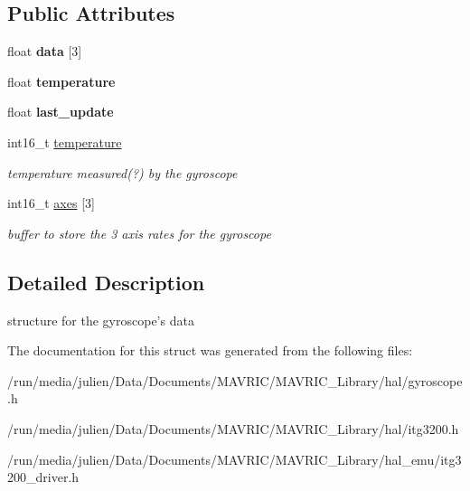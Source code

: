 \subsection*{Public Attributes}
\begin{DoxyCompactItemize}
\item 
\hypertarget{structgyroscope__t_a3ba0fce8e6f280ed2cded2ec97c567e9}{float {\bfseries data} \mbox{[}3\mbox{]}}\label{structgyroscope__t_a3ba0fce8e6f280ed2cded2ec97c567e9}

\item 
\hypertarget{structgyroscope__t_aba7959ef2e0ad2983dc80be17a2e9ab1}{float {\bfseries temperature}}\label{structgyroscope__t_aba7959ef2e0ad2983dc80be17a2e9ab1}

\item 
\hypertarget{structgyroscope__t_a8f8871fc763e415bc9837b1f4c4db964}{float {\bfseries last\+\_\+update}}\label{structgyroscope__t_a8f8871fc763e415bc9837b1f4c4db964}

\item 
\hypertarget{structgyroscope__t_aba7959ef2e0ad2983dc80be17a2e9ab1}{int16\+\_\+t \hyperlink{structgyroscope__t_aba7959ef2e0ad2983dc80be17a2e9ab1}{temperature}}\label{structgyroscope__t_aba7959ef2e0ad2983dc80be17a2e9ab1}

\begin{DoxyCompactList}\small\item\em temperature measured(?) by the gyroscope \end{DoxyCompactList}\item 
\hypertarget{structgyroscope__t_a2657eb86feb4ba0ac21e09d19307208b}{int16\+\_\+t \hyperlink{structgyroscope__t_a2657eb86feb4ba0ac21e09d19307208b}{axes} \mbox{[}3\mbox{]}}\label{structgyroscope__t_a2657eb86feb4ba0ac21e09d19307208b}

\begin{DoxyCompactList}\small\item\em buffer to store the 3 axis rates for the gyroscope \end{DoxyCompactList}\end{DoxyCompactItemize}


\subsection{Detailed Description}
structure for the gyroscope's data 

The documentation for this struct was generated from the following files\+:\begin{DoxyCompactItemize}
\item 
/run/media/julien/\+Data/\+Documents/\+M\+A\+V\+R\+I\+C/\+M\+A\+V\+R\+I\+C\+\_\+\+Library/hal/gyroscope.\+h\item 
/run/media/julien/\+Data/\+Documents/\+M\+A\+V\+R\+I\+C/\+M\+A\+V\+R\+I\+C\+\_\+\+Library/hal/itg3200.\+h\item 
/run/media/julien/\+Data/\+Documents/\+M\+A\+V\+R\+I\+C/\+M\+A\+V\+R\+I\+C\+\_\+\+Library/hal\+\_\+emu/itg3200\+\_\+driver.\+h\end{DoxyCompactItemize}
